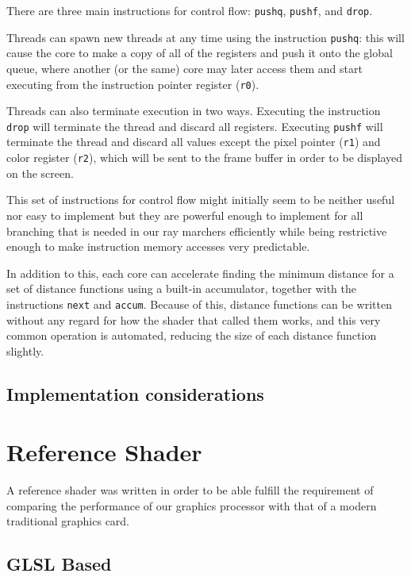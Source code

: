 			There are three main instructions for control flow: \texttt{pushq},
			\texttt{pushf}, and \texttt{drop}. 
			
			Threads can spawn new threads at any time using the instruction
			\texttt{pushq}: this will cause the core to make a copy of all of
			the registers and push it onto the global queue, where another (or
			the same) core may later access them and start executing from the
			instruction pointer register (\texttt{r0}).
			
			Threads can also terminate execution in two ways. Executing the
			instruction \texttt{drop} will terminate the thread and discard all
			registers. Executing \texttt{pushf} will terminate the thread and
			discard all values except the pixel pointer (\texttt{r1}) and color
			register (\texttt{r2}), which will be sent to the frame buffer in
			order to be displayed on the screen.
	
			This set of instructions for control flow might initially seem to
			be neither useful nor easy to implement but they are powerful
			enough to implement for all branching that is needed in our ray
			marchers efficiently while being restrictive enough to make
			instruction memory accesses very predictable.

			In addition to this, each core can accelerate finding the minimum 
			distance for a set of distance functions using a built-in 
			accumulator, together with the instructions \texttt{next} and 
			\texttt{accum}. Because of this, distance functions can be written
			without any regard for how the shader that called them works, and
			this very common operation is automated, reducing the size of each
			distance function slightly.
		
		\subsection{Implementation considerations}
	
	\section{Reference Shader} \label{implshader}
		
		A reference shader was written in order to be able fulfill the
		requirement of comparing the performance of our graphics processor with
		that of a modern traditional graphics card. 
	
		\subsection{GLSL Based}
	
		\subsection{}
